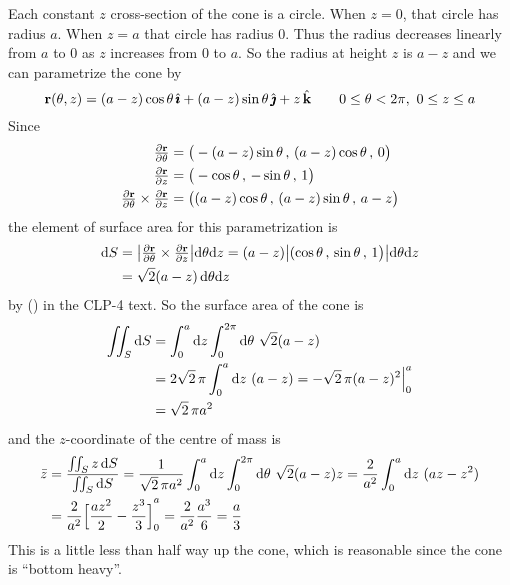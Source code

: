\begin{solution} 
Each constant $z$ cross-section of the cone is a circle. When
$z=0$, that circle has radius $a$. When $z=a$ that circle has radius $0$.
Thus the radius decreases linearly from $a$ to $0$ as $z$ increases from
$0$ to $a$. So the radius at height $z$ is $a-z$ and we can parametrize
the cone by
\begin{equation*}
\mathbf{r}(\theta,z)
  = (a-z)\cos\theta\,\hat{\pmb{\imath}} + (a-z)\sin\theta\,\hat{\pmb{\jmath}} + z\,\hat{\mathbf{k}}\qquad
0\le\theta<2\pi,\ 0\le z\le a
\end{equation*}
Since
\begin{align*}
\tfrac{\partial\mathbf{r}}{\partial\theta}
&=\big(-(a-z)\sin\theta\,,\,
        (a-z)\cos\theta\,,\,
          0 \big) \\
\tfrac{\partial\mathbf{r}}{\partial z}
&=\big(-\cos\theta\,,\,
       -\sin\theta\,,\,
          1 \big) \\
\tfrac{\partial\mathbf{r}}{\partial\theta} \times \tfrac{\partial\mathbf{r}}{\partial z} 
&=\big((a-z)\cos\theta\,,\,
       (a-z)\sin\theta\,,\,
       a-z\big)
\end{align*}
the element of surface area for this parametrization is
\begin{align*}
\mathrm{d}S &= 
\big|\tfrac{\partial\mathbf{r}}{\partial\theta}\times
      \tfrac{\partial\mathbf{r}}{\partial z} \big|\mathrm{d}\theta\mathrm{d}z
=(a-z)\big|(\cos\theta\,,\,\sin\theta\,,\,1\big)\big|
    \mathrm{d}\theta\mathrm{d}z \\ 
&=\sqrt{2}(a-z)\, \mathrm{d}\theta\mathrm{d}z
\end{align*}
by () in the CLP-4 text.
So the surface area of the cone is
\begin{align*}
\iint_S\mathrm{d}S
&=\int_0^a\mathrm{d}z\int_0^{2\pi}\mathrm{d}\theta\ \sqrt{2}(a-z) \\
&=2\sqrt{2}\,\pi\int_0^a\mathrm{d}z\ (a-z)
=-\sqrt{2}\,\pi(a-z)^2\Big|_0^a \\
&=\sqrt{2}\,\pi a^2
\end{align*}
and the $z$-coordinate of the centre of mass is
\begin{align*}
\bar z
&= \frac{\iint_S z\,\mathrm{d}S}{\iint_S\mathrm{d}S}
 =\frac{1}{\sqrt{2}\,\pi a^2}
  \int_0^a\mathrm{d}z\int_0^{2\pi}\mathrm{d}\theta\ \sqrt{2}(a-z) z 
=\frac{2}{a^2}\int_0^a\mathrm{d}z\ (az-z^2) \\
&=\frac{2}{a^2}{\Big[\frac{az^2}{2}-\frac{z^3}{3}\Big]}_0^a 
=\frac{2}{a^2}\frac{a^3}{6}
=\frac{a}{3}
\end{align*}
This is a little less than half way up the cone, which is reasonable since
the cone is ``bottom heavy''.

\end{solution}

